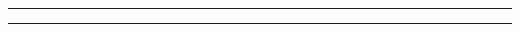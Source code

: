\begin{solution}


\end{solution}

\noindent\rule{7in}{1.5pt}


\begin{problem}{14.13}

\end{problem}

\begin{solution}


\end{solution}

\noindent\rule{7in}{1.5pt}

